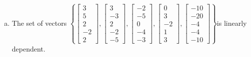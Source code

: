 \begin{exerciseAnswer}
\begin{enumerate}[(a)]
\item  The set of vectors \( \left\{ \left[\begin{array}{c}
3 \\
5 \\
2 \\
-2 \\
2
\end{array}\right] , \left[\begin{array}{c}
3 \\
-3 \\
2 \\
-2 \\
-5
\end{array}\right] , \left[\begin{array}{c}
-2 \\
-5 \\
0 \\
-4 \\
-3
\end{array}\right] , \left[\begin{array}{c}
0 \\
3 \\
-2 \\
1 \\
3
\end{array}\right] , \left[\begin{array}{c}
-10 \\
-20 \\
-4 \\
-4 \\
-10
\end{array}\right] \right\} \)is linearly dependent.
\end{enumerate}
    
\end{exerciseAnswer}
    
